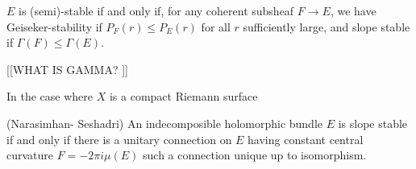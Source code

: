 $ E$ is (semi)-stable if and only if, for any coherent subsheaf $ F \rightarrow  E$, 
we have Geiseker-stability if $P_F ( r) \leq P_E (r) $ for all $r$ sufficiently large, 
and slope stable if $ \Gamma(F) \leq \Gamma(E) $. 

[[WHAT IS GAMMA? ]] 

In the case where $ X $ is a compact Riemann surface 
\begin{theorem}
    (Narasimhan- Seshadri) 
    An indecomposible holomorphic bundle $E$ is slope stable if and only if there is a unitary connection 
    on $E$ having constant central curvature $ F = -2 \pi i \mu (E) $ such a connection unique up to isomorphism. 
\end{theorem}





 

